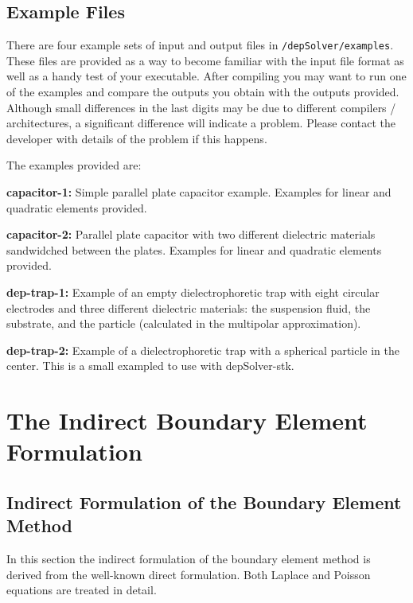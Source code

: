 \documentclass[12pt]{report}
\begin{document}
\chapter{Example Files}
There are four example sets of input and output files in \verb+/depSolver/examples+. These files are provided as a way to become familiar with the input file format as well as a handy test of your executable. After compiling you may want to run one of the examples and compare the outputs you obtain with the outputs provided. Although small differences in the last digits may be due to different compilers / architectures, a significant difference will indicate a problem. Please contact the developer with details of the problem if this happens.

The examples provided are:

\begin{description}
 \item{\bf capacitor-1:} Simple parallel plate capacitor example. Examples for linear and quadratic elements provided.
 \item{\bf capacitor-2:} Parallel plate capacitor with two different dielectric materials sandwidched between the plates. Examples for linear and quadratic elements provided.
 \item{\bf dep-trap-1:}  Example of an empty dielectrophoretic trap with eight circular electrodes and three different dielectric materials: the suspension fluid, the substrate, and the particle (calculated in the multipolar approximation).
\item{\bf dep-trap-2:} Example of a dielectrophoretic trap with a spherical particle in the center. This is a small exampled to use with depSolver-stk.
\end{description}
 
\pagebreak
\section*{}
\pagebreak

\part{The Indirect Boundary Element Formulation}
\pagebreak
\section*{}
\pagebreak

\chapter{Indirect Formulation of the Boundary Element Method}
In this section the indirect formulation of the boundary element method is derived from the well-known direct formulation. Both Laplace and Poisson equations are treated in detail.
\end{document}
